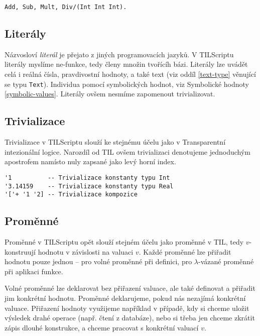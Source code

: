 \begin{lstlisting}[caption={Deklarace funkcí}]
Add, Sub, Mult, Div/(Int Int Int).
\end{lstlisting}

\subsection{Literály}

Názvosloví \textit{literál} je přejato z jiných programovacích jazyků. V TILScriptu literály
myslíme ne-funkce, tedy členy množin tvořícíh bázi. Literály lze uvádět celá i reálná čísla,
pravdivostní hodnoty, a také text (viz oddíl \ref{text-type} věnující se typu \lstinline{Text}).
Individua pomocí symbolických hodnot, viz Symbolické hodnoty \ref{symbolic-values}. Literály ovšem
nesmíme zapomenout trivializovat.

\subsection{Trivializace}

Trivializace v TILScriptu slouží ke stejnému účelu jako v Transparentní intezionální logice.
Narozdíl od TIL ovšem trivializaci denotujeme jednoduchým apostrofem namísto nuly zapsané jako
levý horní index.

\begin{lstlisting}[caption={Příklad trivializace.}]
'1          -- Trivializace konstanty typu Int
'3.14159    -- Trivializace konstanty typu Real
'['+ '1 '2] -- Trivializace kompozice
\end{lstlisting}

\subsection{Proměnné}

Proměnné v TILScriptu opět slouží stejném účelu jako proměnné v TIL, tedy $v$-konstruují hodnotu
v závislosti na valuaci $v$. Každé proměnné lze přiřadit hodnotu pouze jednou -- pro volné proměnné
při definici, pro $\lambda$-vázané proměnné při aplikaci funkce.

Volné proměnné lze deklarovat bez přiřazení valuace, ale také definovat a přiřadit jim konkrétní
hodnotu. Proměnné deklarujeme, pokud nás nezajímá konkrétní valuace. Přiřazení hodnoty využijeme
například v případě, kdy si chceme uložit výsledek drahé operace (např. čtení z databáze), nebo
si třeba jen chceme zkrátit zápis dlouhé konstrukce, a chceme pracovat s konkrétní valuací $v$.

